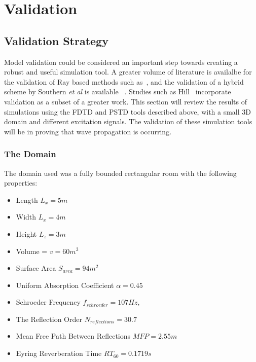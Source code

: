 
\chapter{Validation}
\section{Validation Strategy}
Model validation could be considered an important step towards creating a robust and useful simulation tool. A greater volume of literature is availalbe for the validation of Ray based methods such as~\cite{Ahnert2005,Tsingos2002,Foteinou2010}, and the validation of a hybrid scheme by Southern \textit{et al} is available ~\cite{Southern2013}. Studies such as Hill~\cite{Hill2012} incorporate validation as a subset of a greater work. This section will review the results of simulations using the FDTD and PSTD tools described above, with a small 3D domain and different excitation signals. The validation of these simulation tools will be in proving that wave propagation is occurring.\\

\subsection{The Domain}
The domain used was a fully bounded rectangular room with the following properties:\\

\begin{itemize}
\item Length $L_x = 5m$
\item Width $L_x = 4m$
\item Height $L_z = 3m$
\item Volume = $ v = 60m^3$
\item Surface Area $S_{area} = 94m^2$
\item Uniform Absorption Coefficient $\alpha = 0.45 $
\item Schroeder Frequency  $f_{schroeder} = 107Hz $,
\item The Reflection Order $N_{reflections} = 30.7$
\item Mean Free Path Between Reflections $MFP = 2.55m$
\item Eyring Reverberation Time $RT_{60} = 0.1719s $
\end{itemize}

